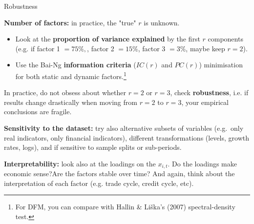 \documentclass{beamer}
\begin{document}
\begin{frame}{Robustness}
\small

\textbf{Number of factors:} in practice, the "true" $r$ is unknown.

\medskip
\begin{itemize}
  \item Look at the \textbf{proportion of variance explained} by the first $r$ components (e.g. if factor 1 $=75\%,$, factor 2 $=15\%$, factor 3 $=3\%$, maybe keep $r=2$).  
  \item Use the Bai-Ng \textbf{information criteria} ($IC(r)$ and $PC(r)$) minimisation for both static and dynamic factors.\footnote{ For DFM, you can compare with Hallin \& Liška's (2007) spectral-density test.}
\end{itemize}

In practice, do not obsess about whether $r = 2$ or $r = 3$, check \textbf{robustness}, i.e. if results change drastically when moving from $r=2$ to $r=3$, your empirical conclusions are fragile. 

\medskip

\textbf{Sensitivity to the dataset: }try also alternative subsets of variables (e.g.\ only real indicators, only financial indicators), different transformations (levels, growth rates, logs), and if sensitive to sample splits or sub-periods.


\medskip

\textbf{Interpretability:} look also at the loadings on the $x_{i,t}$. Do the loadings make economic sense?Are the factors stable over time? And again, think about the interpretation of each factor (e.g. trade cycle, credit cycle, etc). 

\end{frame}
\end{document}
